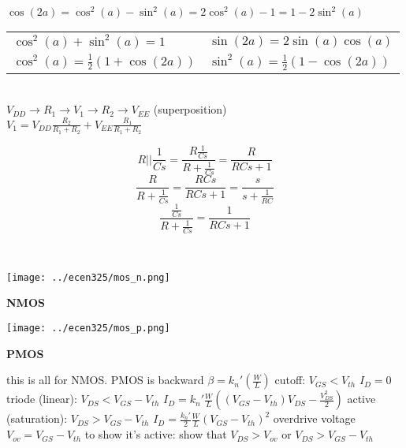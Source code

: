 \documentclass[12pt]{article}
\begin{document}
\begin{spacing}{0.8}
\begin{multicols*}{2}
\begin{flushleft}
\begin{outline}[longenum]
\\
$\cos(2a)=\cos^2(a) - \sin^2(a) = 2\cos^2(a)-1 = 1-2\sin^2(a)$
\\
\begin{tabular}{l|l}
$\cos^2(a)+\sin^2(a)=1$ & $\sin(2a) = 2\sin(a)\cos(a)$ \\
$\cos^2(a) = \frac{1}{2}(1 + \cos(2a))$ & $\sin^2(a) = \frac{1}{2}(1 - \cos(2a))$ \\
\end{tabular}

\\ $V_{DD} \rightarrow R_1 \rightarrow V_1 \rightarrow R_2 \rightarrow V_{EE}$
\hfill(superposition)
\\ $V_1=V_{DD}\frac{R_2}{R_1+R_2}+V_{EE}\frac{R_1}{R_1+R_2}$

$$R||\frac{1}{Cs}
  = \frac{ R\frac{1}{Cs} }{ R+\frac{1}{Cs} }
  = \frac{R}{RCs+1}
$$
$$\frac{R}{R+\frac{1}{Cs}} = \frac{ RCs }{ RCs + 1 } = \frac{s}{s+\frac{1}{RC}}$$
$$\frac{ \frac{1}{Cs} }{ R + \frac{1}{Cs} } = \frac{1}{RCs + 1}$$


\\
\begin{minipage}{0.49\columnwidth}
\texttt{[image: ../ecen325/mos\_n.png]}
\begin{center}
\vspace{-10px}
\textbf{NMOS}
\end{center}
\end{minipage}
\begin{minipage}{0.49\columnwidth}
\texttt{[image: ../ecen325/mos\_p.png]}
\begin{center}
\vspace{-10px}
\textbf{PMOS}
\end{center}
\end{minipage}

  \1 this is all for NMOS. PMOS is backward
  \1 $\beta = k_n' (\frac{W}{L})$
  \1 cutoff: $V_{GS} < V_{th}$
    \2 $I_D=0$
  \1 triode (linear): $V_{DS} < V_{GS}-V_{th}$
    \2 $I_D = k_n' \frac{W}{L}
    \left( (V_{GS}-V_{th})V_{DS} - \frac{V_{DS}^2}{2} \right)$
  \1 active (saturation): $V_{DS} > V_{GS}-V_{th}$
    \2 $I_D = \frac{k_n'}{2}\frac{W}{L}(V_{GS}-V_{th})^2$
    \2 overdrive voltage $V_{ov}=V_{GS}-V_{th}$
  \1 to show it's active: show that $V_{DS} > V_{ov}$ or $V_{DS} > V_{GS} - V_{th}$


\end{outline}
\end{flushleft}
\end{multicols*}
\end{spacing}
\end{document}
